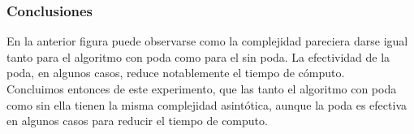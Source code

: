 \subsubsection*{Conclusiones}\;
En la anterior figura puede observarse como la complejidad pareciera darse igual tanto para el algoritmo con poda como para el sin poda. La efectividad de la poda, en algunos casos, reduce notablemente el tiempo de cómputo.\\
Concluimos entonces de este experimento, que las tanto el algoritmo con poda como sin ella tienen la misma complejidad asintótica, aunque la poda es efectiva en algunos casos para reducir el tiempo de computo.
    